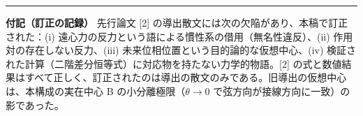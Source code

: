 \documentclass[
  a4paper,
]{ltjsarticle}
\begin{document}
\begin{center}\rule{0.5\linewidth}{0.5pt}\end{center}

\textbf{付記（訂正の記録）} 先行論文 {[}2{]}
の導出散文には次の欠陥があり、本稿で訂正された：(i)
遠心力の反力という語による慣性系の借用（無名性違反）、(ii)
作用対の存在しない反力、(iii) 未来位相位置という目的論的な仮想中心、(iv)
検証された計算（二階差分恒等式）に対応物を持たない力学的物語。{[}2{]}
の式と数値結果はすべて正しく、訂正されたのは導出の散文のみである。旧導出の仮想中心は、本構成の実在中心
B の小分離極限（\(\theta\to0\) で弦方向が接線方向に一致）の影であった。
\end{document}
